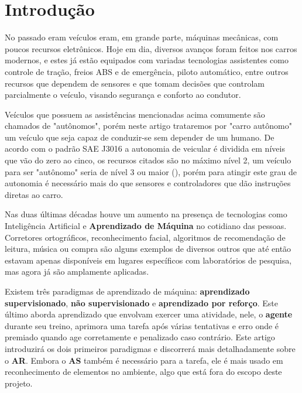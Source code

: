 
\chapter*[Introdução]{Introdução}

No passado eram veículos eram, em grande parte, máquinas mecânicas, com poucos recursos eletrônicos. Hoje em dia, diversos avanços foram feitos nos carros modernos, e estes já estão equipados com variadas tecnologias assistentes como controle de tração, freios ABS e de emergência, piloto automático, entre outros recursos que dependem de sensores e que tomam decisões que controlam parcialmente o veículo, visando segurança e conforto ao condutor. 

Veículos que possuem as assistências mencionadas acima comumente são chamados de "autônomos", porém neste artigo trataremos por "carro autônomo" um veículo que seja capaz de conduzir-se sem depender de um humano. De acordo com o padrão SAE J3016 a autonomia de veicular é dividida em níveis que vão do zero ao cinco, os recursos citados são no máximo nível 2, um veículo para ser "autônomo" seria de nível 3 ou maior (), porém para atingir este grau de autonomia é necessário mais do que sensores e controladores que dão instruções diretas ao carro.

Nas duas últimas décadas houve um aumento na presença de tecnologias como Inteligência Artificial e \textbf{Aprendizado de Máquina} no cotidiano das pessoas. Corretores ortográficos, reconhecimento facial, algoritmos de recomendação de leitura, música ou compra são alguns exemplos de diversos outros que até então estavam apenas disponíveis em lugares específicos com laboratórios de pesquisa, mas agora já são amplamente aplicadas. 

Existem três paradigmas de aprendizado de máquina: \textbf{aprendizado supervisionado}, \textbf{não supervisionado} e \textbf{aprendizado por reforço}. Este último aborda aprendizado que envolvam exercer uma atividade, nele, o \textbf{agente} durante seu treino, aprimora uma tarefa após várias tentativas e erro onde é premiado quando age corretamente e penalizado caso contrário. Este artigo introduzirá os dois primeiros paradigmas e discorrerá mais detalhadamente sobre o \textbf{AR}. Embora o \textbf{AS} também é necessário para a tarefa, ele é mais usado em reconhecimento de elementos no ambiente, algo que está fora do escopo deste projeto.

